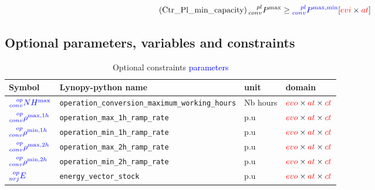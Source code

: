 \documentclass{article}
\begin{document}
\begin{equation} \tag{Ctr\_Pl\_min\_capacity}
   \prescript{pl}{conv}{P^{\max}}  \geq  \textcolor{blue}{ \prescript{pl}{conv}{P}^{\max,\min}} \hfill [\textcolor{red}{evi}  \times \textcolor{red}{at}]
\label{eq:Ctr_Pl_planning_min_capacity}
\end{equation}

\newpage
\subsection{Optional parameters, variables and constraints}

\begin{table}[h]
\footnotesize
\centering
\caption{Optional constraints \textcolor{blue}{parameters}}
\begin{tabular}{llll}
\hline
    \textbf{Symbol} & \textbf{Lynopy-python name} & \textbf{unit}  & \textbf{domain} \\ \hline
    
    $\textcolor{blue}{\prescript{op}{conv}{NH^{\max}}}$&      \verb|operation_conversion_maximum_working_hours| & Nb hours & $\textcolor{red}{evo}  \times \textcolor{red}{at} \times \textcolor{red}{ct} $ \\ 
    
    $\textcolor{blue}{\prescript{op}{conv}{\rho^{\max,1h}}}$&  \verb|operation_max_1h_ramp_rate| & p.u & $\textcolor{red}{evo}  \times \textcolor{red}{at} \times \textcolor{red}{ct} $  \\ 
    
    $\textcolor{blue}{\prescript{op}{conv}{\rho^{\min,1h}}}$&  \verb|operation_min_1h_ramp_rate| & p.u & $\textcolor{red}{evo}  \times \textcolor{red}{at} \times \textcolor{red}{ct} $  \\ 
    
    $\textcolor{blue}{\prescript{op}{conv}{\rho^{\max,2h}}}$&  \verb|operation_max_2h_ramp_rate| & p.u & $\textcolor{red}{evo}  \times \textcolor{red}{at} \times \textcolor{red}{ct} $  \\ 
    
    $\textcolor{blue}{\prescript{op}{conv}{\rho^{\min,2h}}}$&  \verb|operation_min_2h_ramp_rate| & p.u & $\textcolor{red}{evo}  \times \textcolor{red}{at} \times \textcolor{red}{ct} $   \\ \hline
    
    $\textcolor{blue}{\prescript{op}{nrj}{E}}$ &  \verb|energy_vector_stock| & p.u & $\textcolor{red}{evo}  \times \textcolor{red}{at} \times \textcolor{red}{ct} $   \\ \hline
    
  \end{tabular}
\end{table}
\end{document}
